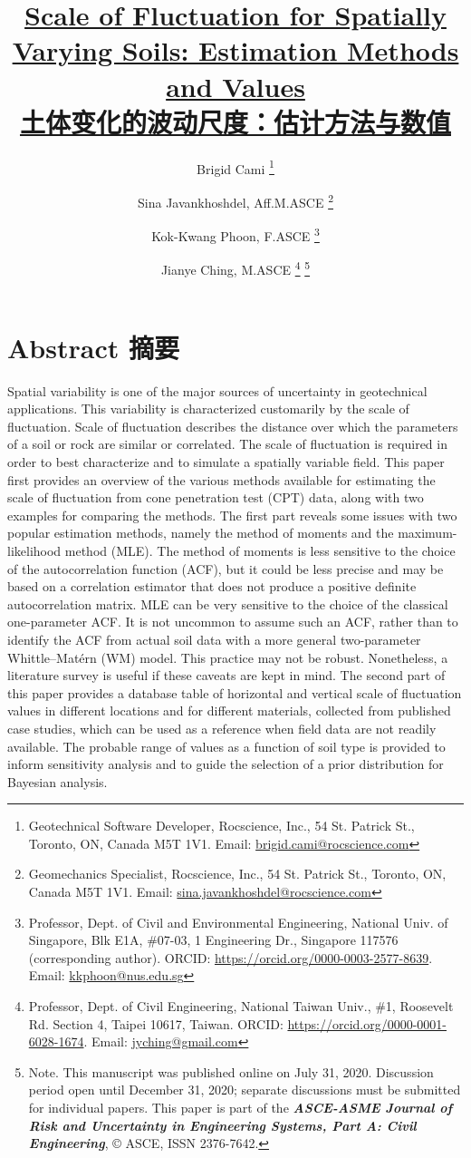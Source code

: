 \documentclass{bilidoc}
\title{\textbf{\href{https://ascelibrary.org/doi/10.1061/AJRUA6.0001083}{Scale of Fluctuation for Spatially Varying Soils: Estimation Methods and Values \\土体变化的波动尺度：估计方法与数值}}}
\author{Brigid Cami \thanks{
    Geotechnical Software Developer, Rocscience, Inc., 54 St. Patrick St., Toronto, ON, Canada M5T 1V1. Email: \url{brigid.cami@rocscience.com}
} \and Sina Javankhoshdel, Aff.M.ASCE \thanks{
    Geomechanics Specialist, Rocscience, Inc., 54 St. Patrick St., Toronto, ON, Canada M5T 1V1. Email: \url{sina.javankhoshdel@rocscience.com}
} \and Kok-Kwang Phoon, F.ASCE \thanks{
    Professor, Dept. of Civil and Environmental Engineering, National Univ. of Singapore, Blk E1A, \#07-03, 1 Engineering Dr., Singapore 117576 (corresponding author). ORCID: \url{https://orcid.org/0000-0003-2577-8639}. Email: \url{kkphoon@nus.edu.sg}
} \and Jianye Ching, M.ASCE \thanks{
    Professor, Dept. of Civil Engineering, National Taiwan Univ., \#1, Roosevelt Rd. Section 4, Taipei 10617, Taiwan. ORCID: \url{https://orcid.org/0000-0001-6028-1674}. Email: \url{jyching@gmail.com}
} \thanks{
    Note. This manuscript was published online on July 31, 2020. Discussion period open until December 31, 2020; separate discussions must be submitted for individual papers. This paper is part of the {\bf\itshape ASCE-ASME Journal of Risk and Uncertainty in Engineering Systems, Part A: Civil Engineering}, © ASCE, ISSN 2376-7642.
}}
\date{}
\begin{document}
\maketitle

\vspace{-13mm}

\section*{Abstract 摘要}

\begin{ParaColumn}[][0.62\textwidth]

    Spatial variability is one of the major sources of uncertainty in geotechnical applications. This variability is characterized customarily by the scale of fluctuation. Scale of fluctuation describes the distance over which the parameters of a soil or rock are similar or correlated. The scale of fluctuation is required in order to best characterize and to simulate a spatially variable field. This paper first provides an overview of the various methods available for estimating the scale of fluctuation from cone penetration test (CPT) data, along with two examples for comparing the methods. The first part reveals some issues with two popular estimation methods, namely the method of moments and the maximum-likelihood method (MLE). The method of moments is less sensitive to the choice of the autocorrelation function (ACF), but it could be less precise and may be based on a correlation estimator that does not produce a positive definite autocorrelation matrix. MLE can be very sensitive to the choice of the classical one-parameter ACF. It is not uncommon to assume such an ACF, rather than to identify the ACF from actual soil data with a more general two-parameter Whittle–Matérn (WM) model. This practice may not be robust. Nonetheless, a literature survey is useful if these caveats are kept in mind. The second part of this paper provides a database table of horizontal and vertical scale of fluctuation values in different locations and for different materials, collected from published case studies, which can be used as a reference when field data are not readily available. The probable range of values as a function of soil type is provided to inform sensitivity analysis and to guide the selection of a prior distribution for Bayesian analysis.
    
    \switchcolumn


\end{ParaColumn}
\end{document}
